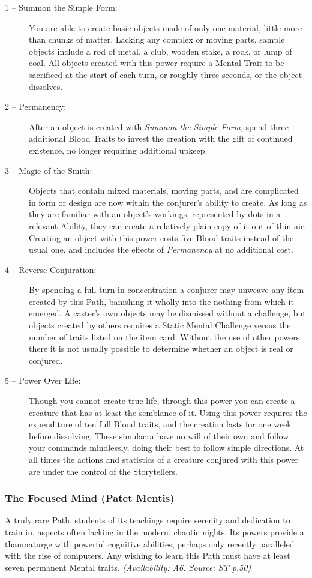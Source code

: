 \begin{description}
	\item[1 -- Summon the Simple Form:]  You are able to create basic objects made of only one material, little more 
	than chunks of matter.  Lacking any complex or moving parts, sample objects include a rod of metal, a club, 
	wooden stake, a rock, or lump of coal.  All objects created with this power require a Mental Trait to be 
	sacrificed at the start of each turn, or roughly three seconds, or the object dissolves.
	\item[2 -- Permanency:]  After an object is created with \emph{Summon the Simple Form}, spend three additional 
	Blood Traits to invest the creation with the gift of continued existence, no longer requiring additional upkeep.
	\item[3 -- Magic of the Smith:]  Objects that contain mixed materials, moving parts, and are complicated in 
	form or design are now within the conjurer's ability to create.  As long as they are familiar with an object's 
	workings, represented by dots in a relevant Ability, they can create a relatively plain copy of it out of thin 
	air.  Creating an object with this power costs five Blood traits instead of the usual one, and includes the 
	effects of \emph{Permanency} at no additional cost.
	\item[4 -- Reverse Conjuration:]  By spending a full turn in concentration a conjurer may unweave any item created 
	by this Path, banishing it wholly into the nothing from which it emerged.  A caster's own objects may be dismissed 
	without a challenge, but objects created by others requires a Static Mental Challenge versus the number of traits 
	listed on the item card.  Without the use of other powers there it is not usually possible to determine whether 
	an object is real or conjured.
	\item[5 -- Power Over Life:]  Though you cannot create true life, through this power you can create a creature that 
	has at least the semblance of it.  Using this power requires the expenditure of ten full Blood traits, and the creation 
	lasts for one week before dissolving.  These simulacra have no will of their own and follow your commands mindlessly, 
	doing their best to follow simple directions.  At all times the actions and statistics of a creature conjured with this 
	power are under the control of the Storytellers.
\end{description}

\subsubsection{The Focused Mind (Patet Mentis)}
A truly rare Path, students of its teachings require serenity and dedication to train in, aspects often lacking in the 
modern, chaotic nights.  Its powers provide a thaumaturge with powerful cognitive abilities, perhaps only recently 
paralleled with the rise of computers.  Any wishing to learn this Path must have at least seven permanent Mental traits.  
\emph{(Availability: A6.  Source: ST p.50)}

